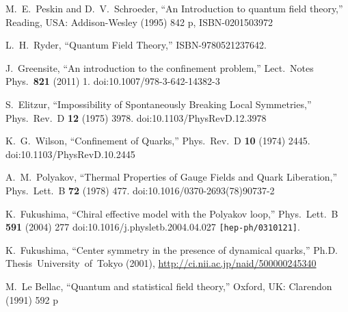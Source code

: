\documentclass[a4paper,11pt,british,twosides]{book}%
\numberwithin{equation}{section}
\begin{document}
\begin{thebibliography}{9}
  M.~E.~Peskin and D.~V.~Schroeder,
  ``An Introduction to quantum field theory,''
  Reading, USA: Addison-Wesley (1995) 842 p,
  ISBN-0201503972

  L.~H.~Ryder,
  ``Quantum Field Theory,''
  ISBN-9780521237642.

  J.~Greensite,
  ``An introduction to the confinement problem,''
  Lect.\ Notes Phys.\  {\bf 821} (2011) 1.
  doi:10.1007/978-3-642-14382-3

  S.~Elitzur,
  ``Impossibility of Spontaneously Breaking Local Symmetries,''
  Phys.\ Rev.\ D {\bf 12} (1975) 3978.
  doi:10.1103/PhysRevD.12.3978

  K.~G.~Wilson,
  ``Confinement of Quarks,''
  Phys.\ Rev.\ D {\bf 10} (1974) 2445.
  doi:10.1103/PhysRevD.10.2445

  A.~M.~Polyakov,
  ``Thermal Properties of Gauge Fields and Quark Liberation,''
  Phys.\ Lett.\ B {\bf 72} (1978) 477.
  doi:10.1016/0370-2693(78)90737-2

  K.~Fukushima,
  ``Chiral effective model with the Polyakov loop,''
  Phys.\ Lett.\ B {\bf 591} (2004) 277
  doi:10.1016/j.physletb.2004.04.027
  {\tt [hep-ph/0310121]}.

  K.~Fukushima,
  ``Center symmetry in the presence of dynamical quarks,''
  Ph.D. Thesis\ University\ of\ Tokyo (2001),
  \url{http://ci.nii.ac.jp/naid/500000245340}

  M.~Le Bellac,
  ``Quantum and statistical field theory,''
  Oxford, UK: Clarendon (1991) 592 p


\end{thebibliography}
\end{document}
